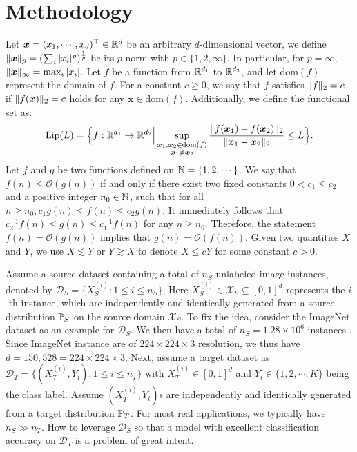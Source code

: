 \section{Methodology}\label{section: methodology}
Let $\bm{x} = (x_1, 
\cdots, x_d)^{\top} \in \R^d$ be an arbitrary $d$-dimensional vector, we define $\norm{\bm{x}}_p = (\sum_i\abs{x_i}^p)^{\frac{1}{p}}$ be its $p$-norm with $p \in \{1, 2, \infty\}$.  In particular, for $p = \infty$, $\norm{\bm{x}}_\infty = \max_i\abs{x_i}$. Let $f$ be a function from $\R^{d_1}$ to $\R^{d_2}$, and let $\mathrm{dom}(f)$ represent the domain of $f$. For a constant $c \geq 0$, we say that $f$ satisfies $\norm{f}_2 = c$ if $\norm{f(\bm{x})}_2 = c$ holds for any $\bm{x} \in \mathrm{dom}(f)$. Additionally, we define the functional set as:
\begin{align}\label{eq: L-Lipschitz function}
    \mathrm{Lip}(L) = \Big\{f:\R^{d_1} \to \R^{d_2} \Big\vert \sup_{\substack{\bm{x}_1, \bm{x}_2\in \mathrm{dom}(f)\\\bm{x}_1 \neq \bm{x}_2}}\frac{\norm{f(\bm{x}_1)-f(\bm{x}_2)}_2}{\norm{\bm{x}_1 - \bm{x}_2}_2} \leq L\Big\}.
\end{align}
Let $f$ and $g$ be two functions defined on $\N = \{1, 2, \cdots\}$. We say that $f(n) \leq \mathcal{O}(g(n))$ if and only if there exist two fixed constants $0 < c_1 \leq  c_2$ and a positive integer $n_0 \in \N$, such that for all $n \geq n_0, c_1 g(n)\leq f(n) \leq c_2 g(n)$. It immediately follows that $c_2^{-1}f(n) \leq g(n) \leq c_1^{-1}f(n)$ for any $n \geq n_0$. Therefore, the statement $f(n) = \mathcal{O}(g(n))$ implies that $g(n) = \mathcal{O}(f(n))$. Given two quantities $X$ and $Y$, we use $X \lesssim Y$ or $Y \gtrsim X$ to denote $X \leq cY$ for some constant $c > 0$.

Assume a source dataset containing a total of $n_S$ unlabeled image instances, denoted by $\mathcal{D}_S = \{X_S^{(i)}: 1 \leq i \leq n_S\}$, Here $X_S^{(i)} \in \mathcal{X}_S \subseteq [0,1]^d$ represents the $i$-th instance, which are independently and identically generated from a source distribution $\P_S$ on the source domain $\mathcal{X}_S$. To fix the idea, consider the ImageNet dataset as an example for $\mathcal{D}_S$. We then have a total of $n_S = 1.28 \times 10^{6}$ instances \citep{deng2009imagenet}. Since ImageNet instance are of $224\times 224\times 3$ resolution, we thus have $d = 150,528 = 224 \times 224 \times 3$. Next, assume a target dataset as $\mathcal{D}_T = \{(X_T^{(i)}, Y_i): 1 \leq i \leq n_T \}$ with $X_T^{(i)} \in [0,1]^d$ and $Y_i \in \{1,2,\cdots, K\}$ being the class label. Assume $(X_T^{(i)}, Y_i)$s are independently and identically generated from a target distribution $\P_T$. For most real applications, we typically have $n_S \gg n_T$. How to leverage $\mathcal{D}_S$ so that a model with excellent classification accuracy on $\mathcal{D}_T$ is a problem of great intent. 

